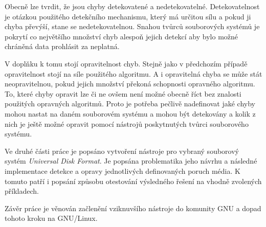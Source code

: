 Obecně lze tvrdit, že jsou chyby detekovatené a nedetekovatelné. Detekovatelnost je otázkou použitého detekčního mechanismu, který má určitou sílu a pokud ji chyba převýší, stane se nedetekovatelnou. Snahou tvůrců souborových systémů je pokrytí co největšího množství chyb alespoň jejich detekcí aby bylo možné chráněná data prohlásit za neplatná.

V doplňku k tomu stojí opravitelnost chyb. Stejně jako v předchozím případě opravitelnost stojí na síle použitého algoritmu. A i opravitelná chyba se může stát neopravitelnou, pokud jejich množství překoná schopnosti opravného algoritmu. To, které chyby opravit lze či ne ovšem není možné obecně říct bez znalosti použitých opravných algoritmů. Proto je potřeba pečlivě nadefinovat jaké chyby mohou nastat na daném souborovém systému a mohou být detekovány a kolik z nich je ještě možné opravit pomocí nástrojů poskytnutých tvůrci souborového systému.
 
Ve druhé části práce je popsáno vytvoření nástroje pro vybraný souborový systém \textit{Universal Disk Format}. Je popsána problematika jeho návrhu a následné implementace detekce a opravy jednotlivých definovaných poruch média. K tomuto patří i popsání způsobu otestování výsledného řešení na vhodně zvolených příkladech.

Závěr práce je věnován začlenění vziknuvšího nástroje do komunity GNU a dopad tohoto kroku na \mbox{GNU/Linux}.  
